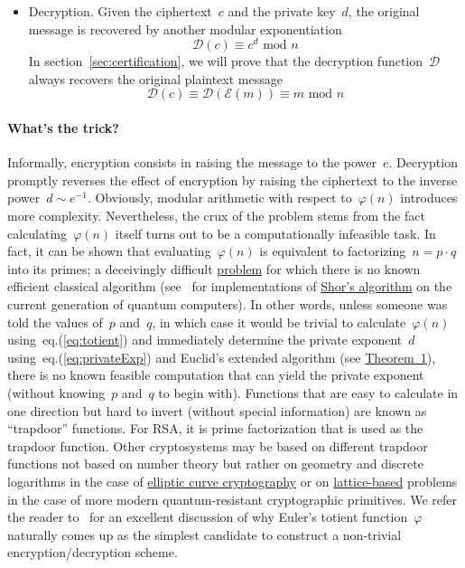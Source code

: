 \documentclass{article}
\begin{document}
\begin{itemize}
\item Decryption.  Given the ciphertext~$c$ and the private key~$d$, the original message is recovered by another modular exponentiation
\begin{equation}
\mathcal{D}(c) \equiv  c^d \,\,\text{mod}\,\,n 
\label{eq::RSA_decrypt}
\end{equation}
In section~\ref{sec:certification}, we will prove that the decryption function~$\mathcal{D}$ always recovers the original plaintext message
\begin{equation*}
\mathcal{D}(c) \equiv \mathcal{D} \left( \mathcal{E}(m) \right) \equiv m \,\,\text{mod}\,\,n
\end{equation*}
\end{itemize}

\paragraph{What's the trick?}  Informally, encryption consists in raising the message to the power~$e$.  Decryption promptly reverses the effect of encryption by raising the ciphertext to the inverse power~$d \sim e^{-1}$.  Obviously, modular arithmetic with respect to~$\varphi(n)$ introduces more complexity.  Nevertheless, the crux of the problem stems from the fact calculating~$\varphi(n)$ itself turns out to be a computationally infeasible task.  In fact, it can be shown that evaluating~$\varphi(n)$ is equivalent to factorizing~$n = p\cdot q$ into its primes; a deceivingly difficult \href{https://en.wikipedia.org/wiki/Integer_factorization}{problem} for which there is no known efficient classical algorithm (see~\cite{RSAquantum} for implementations of \href{https://en.wikipedia.org/wiki/Shor\%27s_algorithm}{Shor's algorithm} on the current generation of quantum computers).  In other words, unless someone was told the values of~$p$ and~$q$, in which case it would be trivial to calculate~$\varphi(n)$ using~eq.(\ref{eq:totient}) and immediately determine the private exponent~$d$ using~eq.(\ref{eq:privateExp}) and Euclid's extended algorithm (see \hyperlink{theorem1}{Theorem~1}), there is no known feasible computation that can yield the private exponent (without knowing~$p$ and~$q$ to begin with).  Functions that are easy to calculate in one direction but hard to invert (without special information) are known as ``trapdoor'' functions.  For RSA, it is prime factorization that is used as the trapdoor function.  Other cryptosystems may be based on different trapdoor functions not based on number theory but rather on geometry and discrete logarithms in the case of \href{https://en.wikipedia.org/wiki/Elliptic-curve_cryptography}{elliptic curve cryptography} or on \href{https://en.wikipedia.org/wiki/Lattice-based_cryptography}{lattice-based} problems in the case of more modern quantum-resistant cryptographic primitives.  We refer the reader to~\cite{sigmaprime} for an excellent discussion of why Euler's totient function~$\varphi$ naturally comes up as the simplest candidate to construct a non-trivial encryption/decryption scheme.
\end{document}

